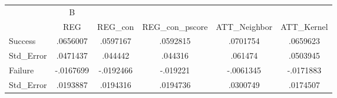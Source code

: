 \begin{tabular}{l*{5}{c}}
\hline\hline
            &           B&            &            &            &            \\
            &         REG&     REG\_con&REG\_con\_pscore&ATT\_Neighbor&  ATT\_Kernel\\
\hline
Success     &    .0656007&    .0597167&    .0592815&    .0701754&    .0659623\\
Std\_Error   &    .0471437&     .044442&     .044316&     .061474&    .0503945\\
Failure     &   -.0167699&   -.0192466&    -.019221&   -.0061345&   -.0171883\\
Std\_Error   &    .0193887&    .0194316&    .0194736&    .0300749&    .0174507\\
\hline\hline
\end{tabular}

